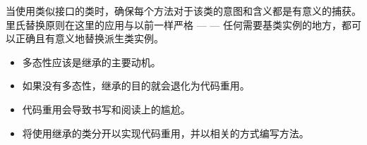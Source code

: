 当使用类似接口的类时，确保每个方法对于该类的意图和含义都是有意义的捕获。里氏替换原则在这里的应用与以前一样严格 — — 任何需要基类实例的地方，都可以正确且有意义地替换派生类实例。


\begin{itemize}
\item
多态性应该是继承的主要动机。

\item
如果没有多态性，继承的目的就会退化为代码重用。

\item
代码重用会导致书写和阅读上的尴尬。

\item
将使用继承的类分开以实现代码重用，并以相关的方式编写方法。
\end{itemize}






